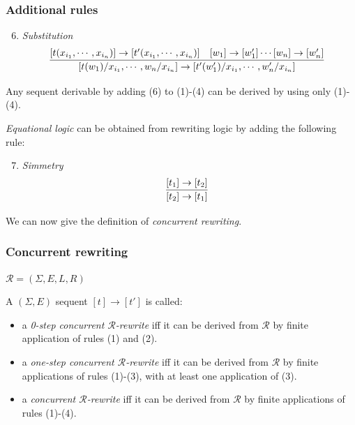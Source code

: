 \documentclass{beamer}
\begin{document}
\begin{frame}
    \frametitle{Additional rules}
    \scriptsize
    \begin{enumerate}
        \setcounter{enumi}{5}
        \item \emph{Substitution}
        $$
        \infer[]
        {[t(w_1)/x_{i_1},\cdots,w_n/x_{i_n}] \rightarrow [t'(w_1')/x_{i_1},\cdots,w_n'/x_{i_n}]}
        {[t(x_{i_1},\cdots,x_{i_n})] \rightarrow [t'(x_{i_1},\cdots,x_{i_n})] \quad [w_1] \rightarrow [w_1'] \cdots [w_n] \rightarrow [w_n']} 
        $$
    \end{enumerate}
    
    Any sequent derivable by adding (6) to  (1)-(4) can be derived by using only (1)-(4).

    \pause 
    \bigskip
    \emph{Equational logic} can be obtained  from rewriting logic by adding the following rule:
    \begin{enumerate}
        \setcounter{enumi}{6}
        \item \emph{Simmetry}
        $$
        \infer[]{[t_2] \rightarrow [t_1]}{[t_1] \rightarrow [t_2]} 
        $$
    \end{enumerate}
    \pause 
    
    \bigskip 
    We can now give the definition of \emph{concurrent rewriting}.
\end{frame}
\begin{frame}
    \frametitle{Concurrent rewriting}
    $\mathcal{R} = (\Sigma, E, L, R)$
    \small
    
    \pause
    \medskip
    A $(\Sigma, E)$ sequent $[t] \rightarrow [t']$ is called:\begin{itemize}
        \item a \emph{0-step concurrent $\mathcal{R}$-rewrite} iff it can be derived from $\mathcal{R}$ by finite application 
        of rules (1) and (2).
        \pause
        \item a \emph{one-step concurrent $\mathcal{R}$-rewrite} iff it can be derived from $\mathcal{R}$
        by finite applications of rules (1)-(3), with at least one application of (3).
        \pause
        \item a \emph{concurrent $\mathcal{R}$-rewrite} iff it can be derived from $\mathcal{R}$ by finite applications of rules (1)-(4).
    \end{itemize}
\end{frame}
\end{document}
